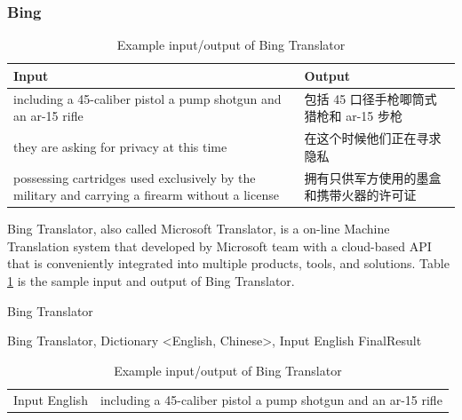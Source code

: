 \begin{CJK}{UTF8}{gbsn}
\subsubsection{Bing}
\begin{table}[ht]
    \caption{Example input/output of Bing Translator}
    \label{table:bing_translator}
    \begin{tabular}{| p{4cm} | p{2.8cm} |}
        \hline
        Input & Output \\
        \hline
        including a 45-caliber pistol a pump shotgun and an ar-15 rifle & 包括 45 口径手枪唧筒式猎枪和 ar-15 步枪\\
        \hline
        they are asking for privacy at this time & 在这个时候他们正在寻求隐私\\
        \hline
        possessing cartridges used exclusively by the military and carrying a firearm without a license & 拥有只供军方使用的墨盒和携带火器的许可证\\
        \hline
    \end{tabular}
\end{table}
Bing Translator, also called Microsoft Translator, is a on-line Machine Translation system that developed by Microsoft team with a cloud-based API that is conveniently integrated into multiple products, tools, and solutions. Table \ref{table:bing_translator} is the sample input and output of Bing Translator.
\\
\begin{algorithm}[ht]
\caption{Bing Translator}
\label{algorithm:wsd_3}
\begin{algorithmic}
\REQUIRE Bing Translator, Dictionary \textless English, Chinese\textgreater, Input English
        \ENDIF
    \ENDFOR
\ENDIF
\RETURN FinalResult
\end{algorithmic}
\end{algorithm}
\begin{table}[ht]
    \caption{Example input/output of Bing Translator}
    \begin{center}
    \begin{tabular}{| p{2.5cm} | p{4cm} |}
        \hline
        Input English & including a 45-caliber pistol a pump shotgun and an ar-15 rifle\\

\end{tabular}
\end{center}
\end{table}
\end{CJK}
